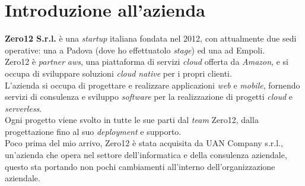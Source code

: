 \section{Introduzione all'azienda}
\label{sez:introduzione-azienda}

\textbf{Zero12 S.r.l.} è una \textit{startup} italiana fondata nel 2012, con attualmente due sedi operative: una a Padova (dove ho effettuatolo \textit{stage}) ed una ad Empoli.\\
Zero12 è \textit{partner} \textit{\gls{aws}}, una piattaforma di servizi \textit{cloud} offerta da \textit{Amazon}, e si occupa di sviluppare soluzioni \textit{cloud native} per i propri clienti.\\
L'azienda si occupa di progettare e realizzare applicazioni \textit{web} e \textit{mobile}, fornendo servizi di consulenza e sviluppo \textit{software} per la realizzazione di progetti \textit{cloud} e \textit{serverless}.\\
Ogni progetto viene svolto in tutte le sue parti dal \textit{team} Zero12, dalla progettazione fino al suo \textit{deployment} e supporto.\\
Poco prima del mio arrivo, Zero12 è stata acquisita da UAN Company s.r.l., un'azienda che opera nel settore dell'informatica e della consulenza aziendale, 
questo sta portando non pochi cambiamenti all'interno dell'organizzazione aziendale.\\